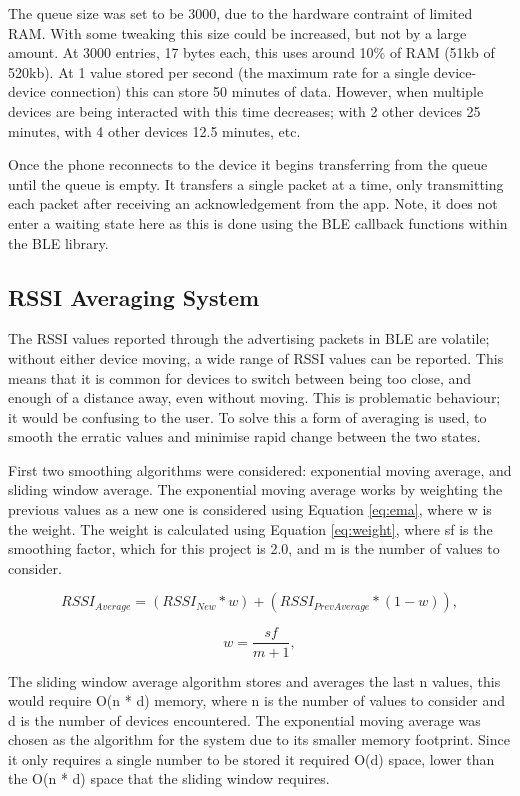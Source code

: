 \documentclass{l4proj}
\begin{document}
The queue size was set to be 3000, due to the hardware contraint of limited RAM. With some tweaking this size could be increased, but not by a large amount. At 3000 entries, 17 bytes each, this uses around 10\% of RAM (51kb of 520kb). At 1 value stored per second (the maximum rate for a single device-device connection) this can store 50 minutes of data. However, when multiple devices are being interacted with this time decreases; with 2 other devices 25 minutes, with 4 other devices 12.5 minutes, etc.

Once the phone reconnects to the device it begins transferring from the queue until the queue is empty. It transfers a single packet at a time, only transmitting each packet after receiving an acknowledgement from the app. Note, it does not enter a waiting state here as this is done using the BLE callback functions within the BLE library.

\subsection{RSSI Averaging System}

The RSSI values reported through the advertising packets in BLE are volatile; without either device moving, a wide range of RSSI values can be reported. This means that it is common for devices to switch between being too close, and enough of a distance away, even without moving. This is problematic behaviour; it would be confusing to the user. To solve this a form of averaging is used, to smooth the erratic values and minimise rapid change between the two states.

First two smoothing algorithms were considered: exponential moving average, and sliding window average. The exponential moving average works by weighting the previous values as a new one is considered using Equation \ref{eq:ema}, where w is the weight. The weight is calculated using Equation \ref{eq:weight}, where sf is the smoothing factor, which for this project is 2.0, and m is the number of values to consider.

\begin{equation}
    {RSSI}_{Average}={({RSSI}_{New} * w)} + {({RSSI}_{PrevAverage} * (1 - w))},
    \label{eq:ema}
\end{equation}

\begin{equation}
    w=\frac{sf}{m + 1},
    \label{eq:weight}
\end{equation}

The sliding window average algorithm stores and averages the last n values, this would require O(n * d) memory, where n is the number of values to consider and d is the number of devices encountered. The exponential moving average was chosen as the algorithm for the system due to its smaller memory footprint. Since it only requires a single number to be stored it required O(d) space, lower than the O(n * d) space that the sliding window requires.
\end{document}
